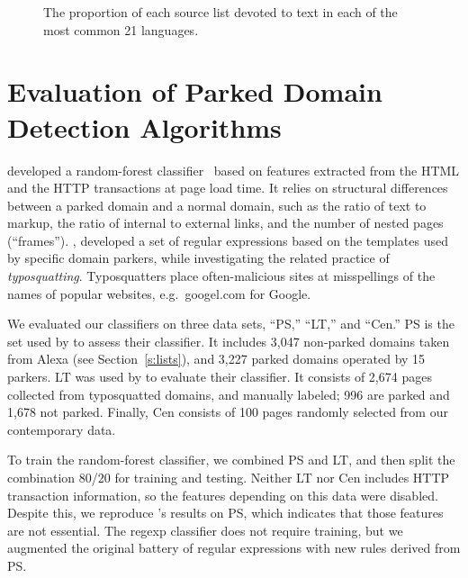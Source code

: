 \appendix

  \begin{figure*}[t!]
\centering\sffamily\relax
\caption{The proportion of each source list devoted to text in each of
the most common 21 languages.}\label{f:language-wordcounts}
\end{figure*}

\section{Evaluation of Parked Domain Detection Algorithms}\label{s:pdd-eval}

\Textcite{vissers2015parking} developed a random-forest
classifier~\cite{Breiman2001} based on features extracted from the
HTML and the HTTP transactions at page load time. It relies on
structural differences between a parked domain and a normal domain,
such as the ratio of text to markup, the ratio of internal to external
links, and the number of nested pages (“frames”).
\Textcite{szurdi2014long}, developed a set of regular expressions
based on the templates used by specific domain parkers, while
investigating the related practice of \emph{typosquatting}.
Typosquatters place often-malicious sites at misspellings of the names
of popular websites, e.g.\ {\UrlFont googel.com} for Google.

We evaluated our classifiers on three data sets,
“PS,” “LT,” and “Cen.”  PS is the set used by
\Textcite{vissers2015parking} to assess their classifier.  It
includes 3,047 non-parked domains taken from Alexa (see
Section~\ref{s:lists}), and 3,227 parked domains operated by 15
parkers.  LT was used by \Textcite{szurdi2014long} to evaluate
their classifier.  It consists of 2,674 pages collected from
typosquatted domains, and manually labeled; 996 are parked and 1,678
not parked.  Finally, Cen consists of 100 pages randomly selected
from our contemporary data.

To train the random-forest classifier, we combined PS and LT, and then
split the combination 80/20 for training and testing.  Neither LT nor
Cen includes HTTP transaction information, so the features depending
on this data were disabled.  Despite this, we reproduce
\citeauthor{vissers2015parking}'s results on PS, which indicates
that those features are not essential.  The regexp classifier does not
require training, but we augmented the original battery of regular
expressions with new rules derived from PS.

